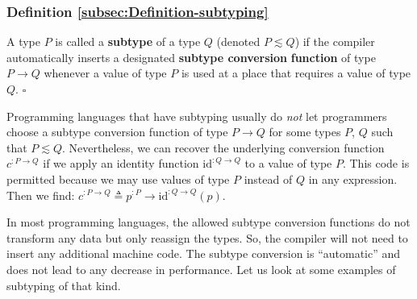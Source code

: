 \subsubsection{Definition \label{subsec:Definition-subtyping}\ref{subsec:Definition-subtyping} }

A type $P$ is called a \textbf{subtype}
of a type $Q$ (denoted $P\lesssim Q$) if the compiler automatically
inserts a designated
\textbf{subtype conversion} \textbf{function} of type $P\rightarrow Q$
whenever a value of type $P$ is used at a place that requires a value
of type $Q$. $\square$

Programming languages that have subtyping usually do \emph{not} let
programmers choose a subtype conversion function of type $P\rightarrow Q$
for some types $P$, $Q$ such that $P\lesssim Q$. Nevertheless,
we can recover the underlying conversion function $c^{:P\rightarrow Q}$
if we apply an identity function $\text{id}^{:Q\rightarrow Q}$ to
a value of type $P$. This code is permitted because we may use values
of type $P$ instead of $Q$ in any expression. Then we find: $c^{:P\rightarrow Q}\triangleq p^{:P}\rightarrow\text{id}^{:Q\rightarrow Q}(p)$.

In most programming languages, the allowed subtype conversion functions
do not transform any data but only reassign the types. So, the compiler
will not need to insert any additional machine code. The subtype conversion
is \textsf{``}automatic\textsf{''} and does not lead to any decrease in performance.
Let us look at some examples of subtyping of that kind. 

